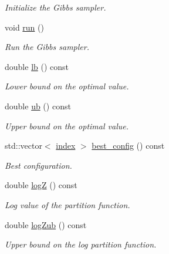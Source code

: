 \begin{DoxyCompactItemize}
\begin{DoxyCompactList}\small\item\em Initialize the Gibbs sampler. \end{DoxyCompactList}\item 
\hypertarget{classmerlin_1_1gibbs_a2f9555aa3830e21e15a74c2ce7dc2109}{}void \hyperlink{classmerlin_1_1gibbs_a2f9555aa3830e21e15a74c2ce7dc2109}{run} ()\label{classmerlin_1_1gibbs_a2f9555aa3830e21e15a74c2ce7dc2109}

\begin{DoxyCompactList}\small\item\em Run the Gibbs sampler. \end{DoxyCompactList}\item 
double \hyperlink{classmerlin_1_1gibbs_a560e770c1d7fe247e5fcb088cd00198c}{lb} () const 
\begin{DoxyCompactList}\small\item\em Lower bound on the optimal value. \end{DoxyCompactList}\item 
double \hyperlink{classmerlin_1_1gibbs_ac433bf8d912355ed96f4d2299f8d71d9}{ub} () const 
\begin{DoxyCompactList}\small\item\em Upper bound on the optimal value. \end{DoxyCompactList}\item 
std\+::vector$<$ \hyperlink{classmerlin_1_1graph_a5cade38832f47248573e921276f122d6}{index} $>$ \hyperlink{classmerlin_1_1gibbs_a10fd6e4e76f510f10a802e97584aff9e}{best\+\_\+config} () const 
\begin{DoxyCompactList}\small\item\em Best configuration. \end{DoxyCompactList}\item 
double \hyperlink{classmerlin_1_1gibbs_a2a57b5f7fa9571060e134164ca39c68f}{log\+Z} () const 
\begin{DoxyCompactList}\small\item\em Log value of the partition function. \end{DoxyCompactList}\item 
double \hyperlink{classmerlin_1_1gibbs_abfd6c9073faa8827b87acf333de77cd6}{log\+Zub} () const 
\begin{DoxyCompactList}\small\item\em Upper bound on the log partition function. \end{DoxyCompactList}\item 

\end{DoxyCompactItemize}
